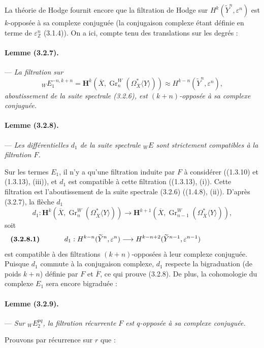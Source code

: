 \documentclass[10pt]{article}
\newcommand{\Z}{\mathbb Z}
\newcommand{\Gr}{\operatorname{Gr}}
\begin{document}
La théorie de Hodge fournit encore que la filtration de Hodge sur $H^k(\widetilde Y^n,\varepsilon^n)$ est $k$-opposée à sa complexe conjuguée (la conjugaison complexe étant définie en terme de $\varepsilon^n_\Z$ (3.1.4)). On a ici, compte tenu des translations sur les degrés :

\paragraph{Lemme (3.2.7).} --- {\itshape La filtration sur
\[
{}_W E_1^{-n,k+n}
=\mathbf H^k(\overline X,\Gr_n^W(\Omega_{\overline X}^{*}\langle Y\rangle))
\approx H^{k-n}(\widetilde Y^n,\varepsilon^n),
\]
aboutissement de la suite spectrale (3.2.6), est $(k+n)$-opposée à sa complexe conjuguée.}

\paragraph{Lemme (3.2.8).} --- {\itshape Les différentielles $d_1$ de la suite spectrale ${}_WE$ sont strictement compatibles à la filtration $F$.}

Sur les termes $E_1$, il n'y a qu'une filtration induite par $F$ à considérer ((1.3.10) et (1.3.13), (iii)), et $d_1$ est compatible à cette filtration ((1.3.13), (i)). Cette filtration est l'aboutissement de la suite spectrale (3.2.6) ((1.4.8), (ii)). D'après (3.2.7), la flèche $d_1$
\[
d_1:\mathbf H^k(\overline X,\Gr_n^W(\Omega_{\overline X}^{*}\langle Y\rangle))
\longrightarrow
\mathbf H^{k+1}(\overline X,\Gr_{n-1}^W(\Omega_{\overline X}^{*}\langle Y\rangle)),
\]
soit
\[
\makebox[\textwidth][s]{\textbf{(3.2.8.1)}\hfill$\displaystyle d_1:H^{k-n}(\widetilde Y^n,\varepsilon^n)\longrightarrow H^{k-n+2}(\widetilde Y^{n-1},\varepsilon^{n-1})$\hfill\phantom{\textbf{(3.2.8.1)}}}
\]
est compatible à des filtrations $(k+n)$-opposées à leur complexe conjuguée. Puisque $d_1$ commute à la conjugaison complexe, $d_1$ respecte la bigraduation (de poids $k+n$) définie par $F$ et $\overline F$, ce qui prouve (3.2.8). De plus, la cohomologie du complexe $E_1$ sera encore bigraduée :

\paragraph{Lemme (3.2.9).} --- {\itshape Sur ${}_WE_2^{pq}$, la filtration récurrente $F$ est $q$-opposée à sa complexe conjuguée.}

Prouvons par récurrence sur $r$ que :
\end{document}
